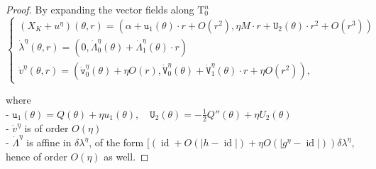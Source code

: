 \documentclass[oneside, 11pt]{amsbook}
\newcommand{\pa}[1]{{\left(#1\right)}}
\newcommand{\normal}{\mathrm}
\newcommand{\teta}{\theta}
\newcommand{\eqsys}[1]{{\left\{\begin{array}{ll}#1\end{array}\right.}}
\newcommand{\h}{\operatorname{H}}
\newcommand{\vh}{v^{\text{H}}} %
\newcommand{\id}{\operatorname{id}}
\newcommand{\heta}{{\eta}}
\newcommand{\tf}{{\mathtt{f}}}
\newcommand{\0}{{(0)}}
\newcommand{\3}{{(3)}}
\newcommand{\hv}{\hat{v}}
\numberwithin{equation}{section}
\numberwithin{defn}{section}
\numberwithin{prop}{section}
\numberwithin{cor}{section}
\numberwithin{lemma}{section}
\numberwithin{rmk}{section}
\numberwithin{corollary}{section}
\begin{document}
\begin{proof}
%


%


By expanding the vector fields along $\normal{T}^n_{0}$
\begin{equation}
\eqsys{
(X_K + u^\eta) (\teta,r)= \pa{\alpha + \mathtt{u}_1(\teta)\cdot r + O(r^2), \eta M\cdot r + \mathtt{U}_2(\teta)\cdot r^2 + O(r^3)}\\
\dot\lambda^\eta(\teta,r) = \pa{0 , \dot \Lambda^\eta_0(\teta) + \dot \Lambda^\eta_1(\teta)\cdot r }\\
\dot v^\eta(\teta,r) = \pa{\dot{\mathtt{v}}^\eta_0(\teta) + \eta O(r), \dot{\mathtt{V}}_0^\eta(\teta) + \dot{\mathtt{V}}^\eta_1(\teta)\cdot r + \eta O(r^2)},}
\label{sviluppi}
 \end{equation}
 
 where \\
 - $\mathtt{u}_1(\teta) = Q(\teta) + \eta u_1(\teta),\quad
  \mathtt{U}_2(\teta) = -\frac12 Q''(\teta) + \eta U_2(\teta)$ \\
  - $\dot v^\eta$ is of order $O(\eta)$\\
  - $\dot\Lambda^\eta$ is affine in $\delta\lambda^\eta$,  of the form $[(\id + O(|h - \id|) + \eta O(|g^\eta - \id|)) \delta\lambda^\eta$, hence of order $O(\eta)$ as well.


\end{proof}
\end{document}
